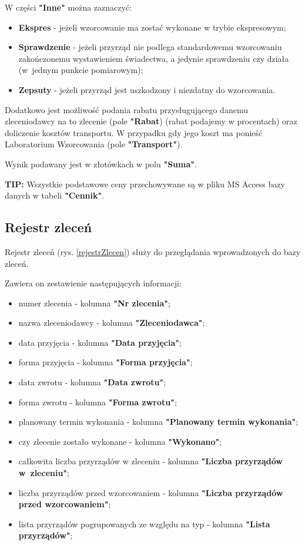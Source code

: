 W części \textbf{"Inne"} można zaznaczyć:
\begin{itemize}
	\item \textbf{Ekspres} - jeżeli wzorcowanie ma zostać wykonane w trybie ekspresowym;
	\item \textbf{Sprawdzenie} - jeżeli przyrząd nie podlega standardowemu wzorcowaniu zakończonemu wystawieniem świadectwa, a jedynie sprawdzeniu czy działa (w~jednym punkcie pomiarowym);
	\item \textbf{Zepsuty} - jeżeli przyrząd jest uszkodzony i niezdatny do wzorcowania.
\end{itemize}

Dodatkowo jest możliwość podania rabatu przysługującego danemu zleceniodawcy na to zlecenie (pole \textbf{"Rabat}) (rabat podajemy w procentach) oraz doliczenie kosztów transportu. W przypadku gdy jego koszt ma ponieść Laboratorium Wzorcowania (pole \textbf{"Transport"}).

Wynik podawany jest w złotówkach w polu \textbf{"Suma"}.

\textbf{TIP:} Wszystkie podstawowe ceny przechowywane są w pliku MS Access bazy danych w tabeli \textbf{"Cennik"}. 


\subsection{Rejestr zleceń}
\label{rejestr}

Rejestr zleceń (rys. \ref{rejestrZlecen}) służy do przeglądania wprowadzonych do bazy zleceń. 

Zawiera on zestawienie następujących informacji: 
\begin{itemize}
	\item numer zlecenia - kolumna \textbf{"Nr zlecenia"};
	\item nazwa zleceniodawcy - kolumna \textbf{"Zleceniodawca"};
	\item data przyjęcia - kolumna \textbf{"Data przyjęcia"};
	\item forma przyjęcia - kolumna \textbf{"Forma przyjęcia"};
	\item data zwrotu - kolumna \textbf{"Data zwrotu"};
	\item forma zwrotu - kolumna \textbf{"Forma zwrotu"};
	\item planowany termin wykonania - kolumna \textbf{"Planowany termin wykonania"};
	\item czy zlecenie zostało wykonane - kolumna \textbf{"Wykonano"};
	\item całkowita liczba przyrządów w zleceniu - kolumna \textbf{"Liczba przyrządów w~zleceniu"};
	\item liczba przyrządów przed wzorcowaniem - kolumna \textbf{"Liczba przyrządów przed wzorcowaniem"};
	\item lista przyrządów pogrupowanych ze względu na typ - kolumna \textbf{"Lista przyrządów"};
\end{itemize}

